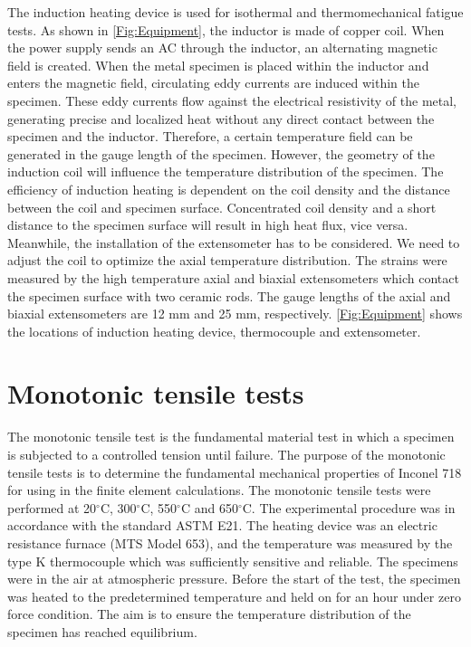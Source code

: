 The induction heating device is used for isothermal and thermomechanical fatigue tests.
As shown in \ref{Fig:Equipment}, the inductor is made of copper coil.
When the power supply sends an AC through the inductor, an alternating magnetic field is created.
When the metal specimen is placed within the inductor and enters the magnetic field, circulating eddy currents are induced within the specimen.
These eddy currents flow against the electrical resistivity of the metal, generating precise and localized heat without any direct contact between the specimen and the inductor.
Therefore, a certain temperature field can be generated in the gauge length of the specimen.
However, the geometry of the induction coil will influence the temperature distribution of the specimen.
The efficiency of induction heating is dependent on the coil density and the distance between the coil and specimen surface.
Concentrated coil density and a short distance to the specimen surface will result in high heat flux, vice versa.
Meanwhile, the installation of the extensometer has to be considered.
We need to adjust the coil to optimize the axial temperature distribution.
The strains were measured by the high temperature axial and biaxial extensometers which contact the specimen surface with two ceramic rods.
The gauge lengths of the axial and biaxial extensometers are 12 mm and 25 mm, respectively.
\ref{Fig:Equipment} shows the locations of induction heating device, thermocouple and extensometer.


\section{Monotonic tensile tests}
\noindent 
The monotonic tensile test is the fundamental material test in which a specimen is subjected to a controlled tension until failure.
The purpose of the monotonic tensile tests is to determine the fundamental mechanical properties of Inconel 718 for using in the finite element calculations.
The monotonic tensile tests were performed at 20$^{\circ}$C, 300$^{\circ}$C, 550$^{\circ}$C and 650$^{\circ}$C.
The experimental procedure was in accordance with the standard ASTM E21.
The heating device was an electric resistance furnace (MTS Model 653), and the temperature was measured by the type K thermocouple which was sufficiently sensitive and reliable.
The specimens were in the air at atmospheric pressure.
Before the start of the test, the specimen was heated to the predetermined temperature and held on for an hour under zero force condition.
The aim is to ensure the temperature distribution of the specimen has reached equilibrium.

